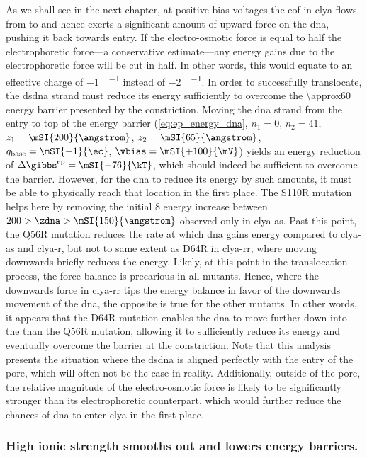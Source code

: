 As we shall see in the next chapter, at positive bias voltages the \gls{eof} in \gls{clya} flows from
\transi{} to \cisi{} and hence exerts a significant amount of upward force on the \gls{dna}, pushing it back
towards \cisi{} entry. If the electro-osmotic force is equal to half the electrophoretic force---a
conservative estimate---any energy gains due to the electrophoretic force will be cut in half. In other words,
this would equate to an effective charge of \SI{-1}{\ec\per\bp} instead of \SI{-2}{\ec\per\bp}. In order to
successfully translocate, the \gls{dsdna} strand must reduce its energy sufficiently to overcome the
\SI{\approx60}{\kT} energy barrier presented by the constriction.  Moving the \gls{dna} strand from the
\cisi{} entry to top of the energy barrier (\cref{eq:ep_energy_dna}, $n_1 = 0$, $n_2 = 41$, $z_1 =
\mSI{200}{\angstrom}$, $z_2 = \mSI{65}{\angstrom}$, $q_{\textrm{base}} = \mSI{-1}{\ec}$, $\vbias =
\mSI{+100}{\mV}$) yields an energy reduction of $\Delta \gibbs^{\textrm{ep}} = \mSI{-76}{\kT}$, which should
indeed be sufficient to overcome the barrier. However, for the \gls{dna} to reduce its energy by such amounts,
it must be able to physically reach that location in the first place. The S110R mutation helps here by
removing the initial \SI{+8}{\kT} energy increase between $200 > \zdna > \mSI{150}{\angstrom}$ observed only
in \gls{clya-as}. Past this point, the Q56R mutation reduces the rate at which \gls{dna} gains energy compared
to \gls{clya-as} and \gls{clya-r}, but not to same extent as D64R in \gls{clya-rr}, where moving downwards
briefly reduces the energy. Likely, at this point in the translocation process, the force balance is
precarious in all mutants. Hence, where the downwards force in \gls{clya-rr} tips the energy balance in favor
of the downwards movement of the \gls{dna}, the opposite is true for the other mutants. In other words, it
appears that the D64R mutation enables the \gls{dna} to move further down into the \lumen{} than the Q56R
mutation, allowing it to sufficiently reduce its energy and eventually overcome the barrier at the
constriction. Note that this analysis presents the situation where the \gls{dsdna} is aligned perfectly with
the entry of the pore, which will often not be the case in reality. Additionally, outside of the pore, the
relative magnitude of the electro-osmotic force is likely to be significantly stronger than its
electrophoretic counterpart, which would further reduce the chances of \gls{dna} to enter \gls{clya} in the
first place.


\subsubsection{High ionic strength smooths out and lowers energy barriers.} 
%

